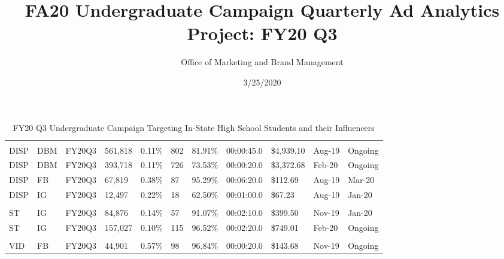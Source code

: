 \documentclass[
  11pt,
]{article}
\title{FA20 Undergraduate Campaign Quarterly Ad Analytics Project: FY20 Q3}
\author{Office of Marketing and Brand Management}
\date{3/25/2020}
\begin{document}
\maketitle

\begin{landscape}\begin{table}

\caption{\label{tab:unnamed-chunk-4}FY20 Q3 Undergraduate Campaign Targeting In-State High School Students and their Influencers}
\centering
\begin{tabu} to 
\toprule
{} &  &  &  &  &  &  &  &  &  & \\
\midrule
\addlinespace[0.3em]
\\
\hspace{1em}DISP & DBM & FY20Q3 & 561,818 & 0.11\% & 802 & 81.91\% & 00:00:45.0 & \$4,939.10 & Aug-19 & Ongoing\\
\hspace{1em}DISP & DBM & FY20Q3 & 393,718 & 0.11\% & 726 & 73.53\% & 00:00:20.0 & \$3,372.68 & Feb-20 & Ongoing\\
\hspace{1em}DISP & FB & FY20Q3 & 67,819 & 0.38\% & 87 & 95.29\% & 00:06:20.0 & \$112.69 & Aug-19 & Mar-20\\
\hspace{1em}DISP & IG & FY20Q3 & 12,497 & 0.22\% & 18 & 62.50\% & 00:01:00.0 & \$67.23 & Aug-19 & Jan-20\\
\addlinespace[0.3em]
\\
\hspace{1em}ST & IG & FY20Q3 & 84,876 & 0.14\% & 57 & 91.07\% & 00:02:10.0 & \$399.50 & Nov-19 & Jan-20\\
\hspace{1em}ST & IG & FY20Q3 & 157,027 & 0.10\% & 115 & 96.52\% & 00:02:20.0 & \$749.01 & Feb-20 & Ongoing\\
\addlinespace[0.3em]
\\
\hspace{1em}VID & FB & FY20Q3 & 44,901 & 0.57\% & 98 & 96.84\% & 00:00:20.0 & \$143.68 & Nov-19 & Ongoing\\

\end{tabu}
\end{table}
\end{landscape}
\end{document}
